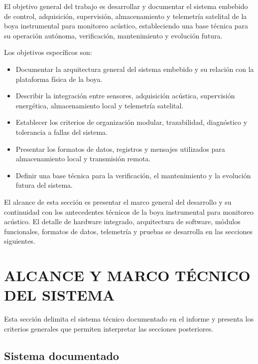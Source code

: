 El objetivo general del trabajo es desarrollar y documentar el sistema embebido de control, adquisición, supervisión, almacenamiento y telemetría satelital de la boya instrumental para monitoreo acústico, estableciendo una base técnica para su operación autónoma, verificación, mantenimiento y evolución futura.

Los objetivos específicos son:

\begin{itemize}
    \item Documentar la arquitectura general del sistema embebido y su relación con la plataforma física de la boya.

    \item Describir la integración entre sensores, adquisición acústica, supervisión energética, almacenamiento local y telemetría satelital.

    \item Establecer los criterios de organización modular, trazabilidad, diagnóstico y tolerancia a fallas del sistema.

    \item Presentar los formatos de datos, registros y mensajes utilizados para almacenamiento local y transmisión remota.

    \item Definir una base técnica para la verificación, el mantenimiento y la evolución futura del sistema.
\end{itemize}

El alcance de esta sección es presentar el marco general del desarrollo y su continuidad con los antecedentes técnicos de la boya instrumental para monitoreo acústico. El detalle de hardware integrado, arquitectura de software, módulos funcionales, formatos de datos, telemetría y pruebas se desarrolla en las secciones siguientes.



\clearpage

\section{ALCANCE Y MARCO TÉCNICO DEL SISTEMA}
\label{sec:alcance_marco_tecnico}

Esta sección delimita el sistema técnico documentado en el informe y presenta los criterios generales que permiten interpretar las secciones posteriores.

\subsection{Sistema documentado}
\label{subsec:sistema_documentado}

